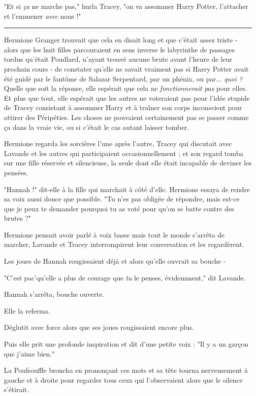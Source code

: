 "Et si \emph{ça}  ne marche pas," hurla Tracey, "on va assommer Harry Potter, l'attacher et l'emmener \emph{avec}  nous !"
\par\noindent\rule{\textwidth}{0.4pt}
Hermione Granger trouvait que cela en disait long et que c'était assez triste - alors que les huit filles parcouraient en sens inverse le labyrinthe de passages tordus qu'était Poudlard, n'ayant trouvé aucune brute avant l'heure de leur prochain cours - de constater qu'elle ne savait vraiment pas si Harry Potter avait été guidé par le fantôme de Salazar Serpentard, par un phénix, ou par... \emph{quoi ?}  Quelle que soit la réponse, elle espérait que cela ne \emph{fonctionnerait pas}  pour elles. Et plus que tout, elle espérait que les autres ne voteraient pas pour l'idée stupide de Tracey consistant à assommer Harry et à traîner son corps inconscient pour attirer des Péripéties. Les choses ne pouvaient certainement pas se passer comme ça dans la vraie vie, ou si c'était le cas autant laisser tomber.

Hermione regarda les sorcières l'une après l'autre, Tracey qui discutait avec Lavande et les autres qui participaient occasionnellement ; et son regard tomba sur une fille réservée et silencieuse, la seule dont elle était incapable de deviner les pensées.

"Hannah !" dit-elle à la fille qui marchait à côté d'elle. Hermione essaya de rendre sa voix aussi douce que possible. "Tu n'es pas obligée de répondre, mais est-ce que je peux te demander pourquoi tu as voté pour qu'on se batte contre des brutes ?"

Hermione pensait avoir parlé à voix basse mais tout le monde s'arrêta de marcher, Lavande et Tracey interrompirent leur conversation et les regardèrent.

Les joues de Hannah rougissaient déjà et alors qu'elle ouvrait sa bouche -

"C'est pac'qu'elle a plus de courage que \emph{tu}  le penses, évidemment," dit Lavande.

Hannah s'arrêta, bouche ouverte.

Elle la referma.

Déglutit avec force alors que ses joues rougissaient encore plus.

Puis elle prit une profonde inspiration et dit d'une petite voix : "Il y a un garçon que j'aime bien."

La Poufsouffle broncha en prononçant ces mots et sa tête tourna nerveusement à gauche et à droite pour regarder tous ceux qui l'observaient alors que le silence s'étirait.

